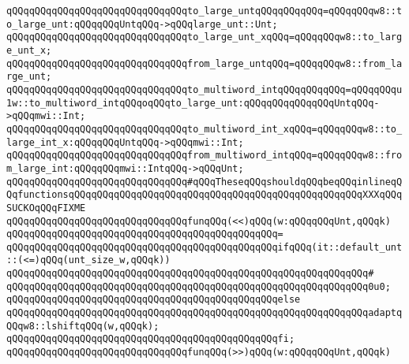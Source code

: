 \newline
\verb|qQQqqQQqqQQqqQQqqQQqqQQqqQQqqQQqto_large_untqQQqqQQqqQQq=qQQqqQQqw8::to_large_unt:qQQqqQQqUntqQQq->qQQqlarge_unt::Unt;|\newline
\verb|qQQqqQQqqQQqqQQqqQQqqQQqqQQqqQQqto_large_unt_xqQQq=qQQqqQQqw8::to_large_unt_x;|\newline
\verb|qQQqqQQqqQQqqQQqqQQqqQQqqQQqqQQqfrom_large_untqQQq=qQQqqQQqw8::from_large_unt;|\newline
\newline
\verb|qQQqqQQqqQQqqQQqqQQqqQQqqQQqqQQqto_multiword_intqQQqqQQqqQQq=qQQqqQQqu1w::to_multiword_intqQQqoqQQqto_large_unt:qQQqqQQqqQQqqQQqUntqQQq->qQQqmwi::Int;|\newline
\verb|qQQqqQQqqQQqqQQqqQQqqQQqqQQqqQQqto_multiword_int_xqQQq=qQQqqQQqw8::to_large_int_x:qQQqqQQqUntqQQq->qQQqmwi::Int;|\newline
\verb|qQQqqQQqqQQqqQQqqQQqqQQqqQQqqQQqfrom_multiword_intqQQq=qQQqqQQqw8::from_large_int:qQQqqQQqmwi::IntqQQq->qQQqUnt;|\newline
\newline
\newline
\verb|qQQqqQQqqQQqqQQqqQQqqQQqqQQqqQQq#qQQqTheseqQQqshouldqQQqbeqQQqinlineqQQqfunctionsqQQqqQQqqQQqqQQqqQQqqQQqqQQqqQQqqQQqqQQqqQQqqQQqqQQqXXXqQQqSUCKOqQQqFIXME|\newline
\newline
\verb|qQQqqQQqqQQqqQQqqQQqqQQqqQQqqQQqfunqQQq(<<)qQQq(w:qQQqqQQqUnt,qQQqk)|\newline
\verb|qQQqqQQqqQQqqQQqqQQqqQQqqQQqqQQqqQQqqQQqqQQqqQQq=|\newline
\verb|qQQqqQQqqQQqqQQqqQQqqQQqqQQqqQQqqQQqqQQqqQQqqQQqifqQQq(it::default_unt::(<=)qQQq(unt_size_w,qQQqk))|\newline
\verb|qQQqqQQqqQQqqQQqqQQqqQQqqQQqqQQqqQQqqQQqqQQqqQQqqQQqqQQqqQQqqQQq#|\newline
\verb|qQQqqQQqqQQqqQQqqQQqqQQqqQQqqQQqqQQqqQQqqQQqqQQqqQQqqQQqqQQqqQQq0u0;|\newline
\verb|qQQqqQQqqQQqqQQqqQQqqQQqqQQqqQQqqQQqqQQqqQQqqQQqelse|\newline
\verb|qQQqqQQqqQQqqQQqqQQqqQQqqQQqqQQqqQQqqQQqqQQqqQQqqQQqqQQqqQQqqQQqadaptqQQqw8::lshiftqQQq(w,qQQqk);|\newline
\verb|qQQqqQQqqQQqqQQqqQQqqQQqqQQqqQQqqQQqqQQqqQQqqQQqfi;|\newline
\newline
\verb|qQQqqQQqqQQqqQQqqQQqqQQqqQQqqQQqfunqQQq(>>)qQQq(w:qQQqqQQqUnt,qQQqk)|\newline
